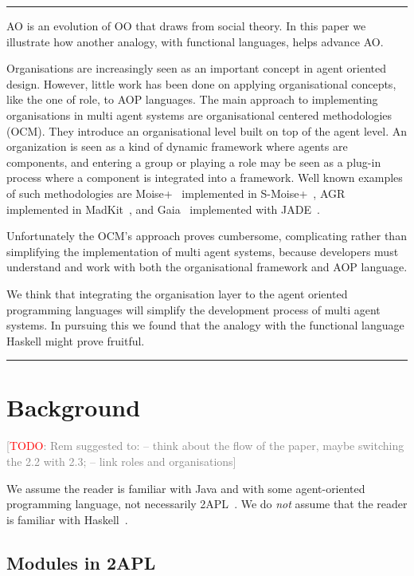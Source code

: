 \documentclass[conference,compsoc]{IEEEtran} %
\newcommand{\todo}[1]{{\small \textcolor{gray}{[\textcolor{red}{TODO}: #1]}}}
\newenvironment{notes}{\medskip\hrule\nobreak\smallskip\narrower}{\smallskip\hrule\medskip}
\begin{document}
\begin{notes}
AO is an evolution of OO that draws from social theory. In this paper we
illustrate how another analogy, with functional languages, helps advance 
AO\null. 

Organisations are increasingly seen as an important concept in agent
oriented design. However, little work has been done on applying
organisational concepts, like the one of role, to AOP languages. The main
approach to implementing organisations in multi agent systems are
organisational centered methodologies (OCM). They introduce an
organisational level built on top of the agent level. An organization is
seen as a kind of dynamic framework where agents are components, and
entering a group or playing a role may be seen as a plug-in process where a
component is integrated into a framework. Well known examples of such
methodologies are Moise+~\cite{DBLP:conf/atal/HubnerSB05} implemented in
S-Moise+~\cite{DBLP:conf/atal/HubnerSB05},
AGR~\cite{DBLP:conf/aose/FerberGM03} implemented in
MadKit~\cite{DBLP:conf/agents/GutknechtF00a}, and
Gaia~\cite{DBLP:journals/tosem/ZambonelliJW03} implemented with
JADE~\cite{DBLP:conf/jit/MoraitisPS02}.

Unfortunately the OCM's approach proves cumbersome, complicating rather
than simplifying the implementation of multi agent systems, because
developers must understand and work with both the organisational framework
and AOP language.

We think that integrating the organisation layer to the agent oriented
programming languages will simplify the development process of multi agent
systems. In pursuing this we found that the analogy with the functional
language Haskell might prove fruitful.  

\end{notes}

\section{Background} %

\todo{Rem suggested to: -- think about the flow of the paper, maybe switching the 2.2 with 2.3; -- link roles and organisations}

We assume the reader is familiar with Java and with some agent-oriented
programming language, not necessarily
2APL~\cite{DBLP:journals/aamas/Dastani08}. We do \emph{not} assume that the
reader is familiar with Haskell~\cite{web:haskell}.

\subsection{Modules in 2APL} %
\end{document}
